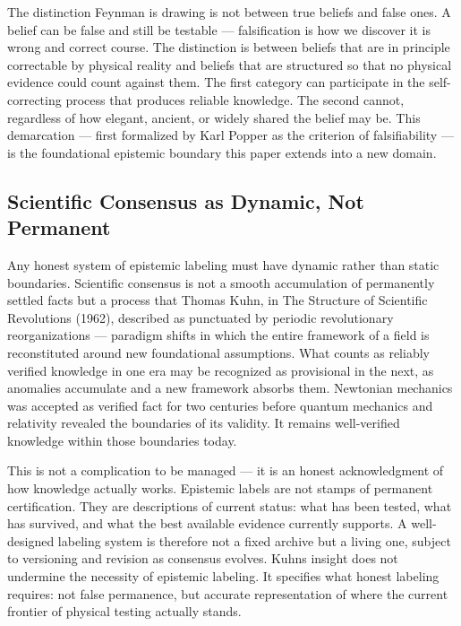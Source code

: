 \documentclass[12pt]{article}
\begin{document}
The distinction Feynman is drawing is not between true beliefs and false
ones. A belief can be false and still be testable --- falsification is
how we discover it is wrong and correct course. The distinction is
between beliefs that are in principle correctable by physical reality
and beliefs that are structured so that no physical evidence could count
against them. The first category can participate in the self-correcting
process that produces reliable knowledge. The second cannot, regardless
of how elegant, ancient, or widely shared the belief may be. This
demarcation --- first formalized by Karl Popper as the criterion of
falsifiability --- is the foundational epistemic boundary this paper
extends into a new domain.

\subsection{Scientific Consensus as Dynamic, Not Permanent}\label{scientific-consensus-as-dynamic-not-permanent}

Any honest system of epistemic labeling must have dynamic rather than
static boundaries. Scientific consensus is not a smooth accumulation of
permanently settled facts but a process that Thomas Kuhn, in The
Structure of Scientific Revolutions (1962), described as punctuated by
periodic revolutionary reorganizations --- paradigm shifts in which the
entire framework of a field is reconstituted around new foundational
assumptions. What counts as reliably verified knowledge in one era may
be recognized as provisional in the next, as anomalies accumulate and a
new framework absorbs them. Newtonian mechanics was accepted as verified
fact for two centuries before quantum mechanics and relativity revealed
the boundaries of its validity. It remains well-verified knowledge
within those boundaries today.

This is not a complication to be managed --- it is an honest
acknowledgment of how knowledge actually works. Epistemic labels are not
stamps of permanent certification. They are descriptions of current
status: what has been tested, what has survived, and what the best
available evidence currently supports. A well-designed labeling system
is therefore not a fixed archive but a living one, subject to versioning
and revision as consensus evolves. Kuhn\textquotesingle s insight does
not undermine the necessity of epistemic labeling. It specifies what
honest labeling requires: not false permanence, but accurate
representation of where the current frontier of physical testing
actually stands.
\end{document}
